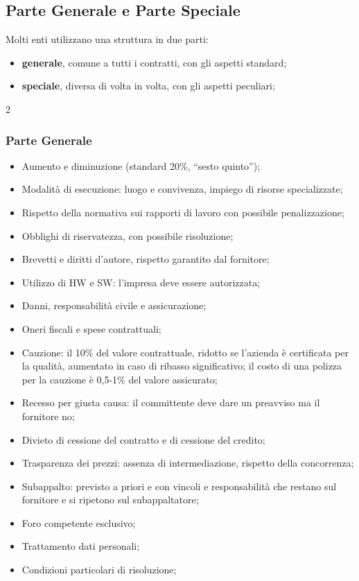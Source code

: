 \documentclass{article}
\begin{document}
\subsection{Parte Generale e Parte Speciale}\label{sub:parte_generale_e_parte_speciale} %
Molti enti utilizzano una struttura in due parti:
\begin{itemize}
    \item \textbf{generale}, comune a tutti i contratti, con gli aspetti standard;
    \item \textbf{speciale}, diversa di volta in volta, con gli aspetti peculiari;
\end{itemize}
%
\begin{multicols}{2}
\subsubsection{Parte Generale}\label{sub:parte_generale} %
    \begin{itemize}
        \item Aumento e diminuzione (standard 20\%, ``sesto quinto'');
        \item Modalità di esecuzione: luogo e convivenza, impiego di risorse specializzate;
        \item Rispetto della normativa sui rapporti di lavoro con possibile penalizzazione;
        \item Obblighi di riservatezza, con possibile risoluzione;
        \item Brevetti e diritti d'autore, rispetto garantito dal fornitore;
        \item Utilizzo di HW e SW: l'impresa deve essere autorizzata;
        \item Danni, responsabilità civile e assicurazione;
        \item Oneri fiscali e spese contrattuali;
        \item Cauzione: il 10\% del valore contrattuale, ridotto se l'azienda è certificata per la qualità, aumentato in caso di ribasso significativo; il costo di una polizza per la cauzione è 0,5-1\% del valore assicurato;
        \item Recesso per giusta causa: il committente deve dare un preavviso ma il fornitore no;
        \item Divieto di cessione del contratto e di cessione del credito;
        \item Trasparenza dei prezzi: assenza di intermediazione, rispetto della concorrenza;
        \item Subappalto: previsto a priori e con vincoli e responsabilità che restano sul fornitore e si ripetono sul subappaltatore;
        \item Foro competente esclusivo;
        \item Trattamento dati personali;
        \item Condizioni particolari di risoluzione;
    \end{itemize}
%

\end{multicols}
\end{document}
